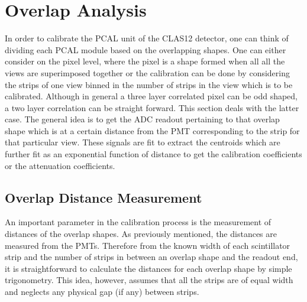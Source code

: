 \section{Overlap Analysis}
In order to calibrate the PCAL unit of the CLAS12 detector, one can think of dividing each PCAL module based on the 
overlapping shapes. One can either consider on the pixel level, where the pixel is a shape formed when all 
all the views are superimposed together or the calibration can be done by considering the strips of one 
view binned in the number of strips in the view which is to be calibrated. Although in general a three layer 
correlated pixel can be odd shaped, a two layer correlation can be straight forward. This section deals with the 
latter case. The general idea is to get the ADC readout pertaining to that overlap shape which is at a certain 
distance from the PMT corresponding to the strip for that particular view. These signals are fit to extract the 
centroids which are further fit as an exponential function of distance to get the calibration coefficients 
or the attenuation coefficients. 

\FloatBarrier
\subsection{Overlap Distance Measurement}
An important parameter in the calibration process is the measurement of distances of the overlap shapes. 
As previously mentioned, the distances are measured from the PMTs. Therefore from the known width of each 
scintillator strip and the number of strips in between an overlap shape and the readout end, it is 
straightforward to calculate the distances for each overlap shape by simple trigonometry. This idea, 
however, assumes that all the strips are of equal width and neglects any physical gap (if any) between strips.

